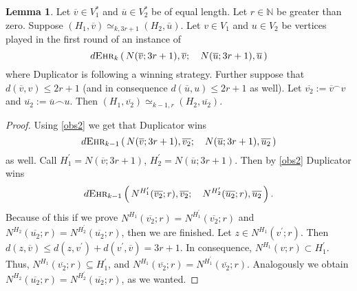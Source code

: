 \documentclass[12pt,notitlepage,a4paper]{article}
\theoremstyle{definition}
\newtheorem{lemma}{Lemma}[section]
\newcommand{\N}{\mathbb{N}}
\newcommand{\ehr}{\textsc{Ehr}}
\begin{document}
\begin{lemma} \label{lemm:Duplicator}
	Let $\overline{v}\in V_1^*$ and
	$\overline{u} \in V_2^*$ be of equal length. Let
	$r\in \N$ be greater than zero. Suppose
	$(H_1,\overline{v})\simeq_{k,3r+1} (H_2,\overline{u})$.
	Let $v \in V_1$ and $u\in V_2$
	be vertices played in the first round of an instance of 
	\[
	d\ehr_k\left(\, N(\overline{v};3r+1),
	\overline{v}; \quad N(\overline{u};3r+1),\overline{u}\, \right)
	\]
	where Duplicator is following a winning strategy. Further suppose
	that $d(\overline{v},v)\leq 2r+1$ (and in consequence
	$d(\overline{u},u)\leq 2r+1$ as well). 
	Let $\overline{v_2}:=\overline{v}^\smallfrown v$
	and $\overline{u_2}:=\overline{u}\smallfrown u$.
	Then $(H_1,\overline{v_2})\simeq_{k-1,r}
	(H_2,\overline{u_2})$.
\end{lemma}

\begin{proof}
	Using \cref{obs2} we get that Duplicator wins 
	\[
	d\ehr_{k-1}\left(\, N(\overline{v};3r+1),
	\overline{v_2}; \quad N(\overline{u};3r+1)
	,\overline{u_2} \, \right)\]
	as well. Call $H^\prime_1=N(\overline{v};3r+1)$,
	$H^\prime_2=N(\overline{u};3r+1)$. Then by \cref{obs2}
	Duplicator wins
	\[
	d\ehr_{k-1}\left(\, N^{H^\prime_1}(
	\overline{v_2};r),\overline{v_2};\quad
	N^{H^\prime_2}(\overline{u_2};r),\overline{u_2}\, \right).
	\]
	Because of this if we prove $N^{H_1}(\overline{v_2};r)
	=N^{H^\prime_1}(\overline{v_2};r)$ and $N^{H_2}(\overline{u_2};r)
	=N^{H^\prime_2}(\overline{u_2};r)$, then we are finished. 
	Let $z\in N^{H_1}(v^\prime;r)$. Then
	$d(z,\overline{v})\leq d(z,v^\prime)+d(v^\prime,\overline{v})=3r+1$.
	In consequence, $N^{H_1}(v;r)\subset H^\prime_1$. Thus,
	$N^{H_1}(\overline{v_2};r)\subseteq H^\prime_1$, and $N^{H_1}(\overline{v_2};r)
	=N^{H^\prime_1}(\overline{v_2};r)$. Analogously we obtain 
	$N^{H_2}(\overline{u_2};r)=N^{H^\prime_2}(\overline{u_2};r)$, as we wanted. 
\end{proof}
\end{document}
